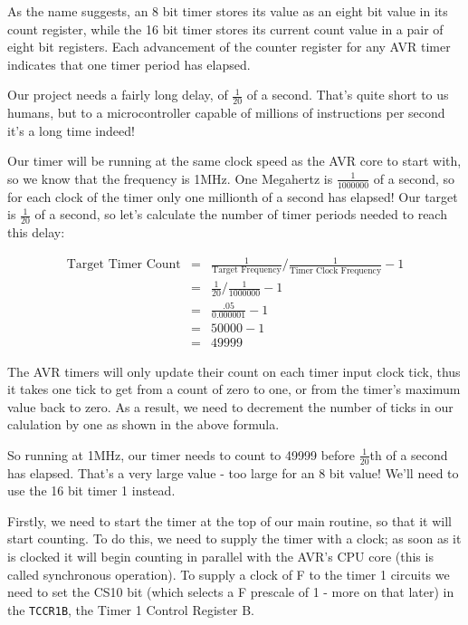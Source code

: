 \documentclass[a4paper,oneside,notitlepage]{book}
\begin{document}
As the name suggests, an 8 bit timer stores its value as an eight bit value in its count register, while the 16 bit timer stores its current count value in a pair of eight bit registers. Each advancement of the counter register for any AVR timer indicates that one timer period has elapsed.

Our project needs a fairly long delay, of \(\frac{1}{20}\) of a second. That's quite short to us humans, but to a microcontroller capable of millions of instructions per second it's a long time indeed!

Our timer will be running at the same clock speed as the AVR core to start with, so we know that the frequency is 1MHz. One Megahertz is \(\frac{1}{1000000}\) of a second, so for each clock of the timer only one millionth of a second has elapsed! Our target is \(\frac{1}{20}\) of a second, so let's calculate the number of timer periods needed to reach this delay:

\begin{displaymath}
\begin{array}{rcl}
\text{Target Timer Count} & = & \frac{1}{\text{Target Frequency}} / \frac{1}{\text{Timer Clock Frequency}} - 1 \\[6pt]
                          & = & \frac{1}{20} / \frac{1}{1000000} - 1 \\[6pt]
                          & = & \frac{.05}{0.000001} - 1 \\[6pt]
                          & = & 50000 - 1 \\[6pt]
                          & = & 49999
\end{array}
\end{displaymath}

The AVR timers will only update their count on each timer input clock tick, thus it takes one tick to get from a count of zero to one, or from the timer's maximum value back to zero. As a result, we need to decrement the number of ticks in our calulation by one as shown in the above formula.

So running at 1MHz, our timer needs to count to 49999 before \(\frac{1}{20}\)th of a second has elapsed. That's a very large value - too large for an 8 bit value! We'll need to use the 16 bit timer 1 instead.

Firstly, we need to start the timer at the top of our main routine, so that it will start counting. To do this, we need to supply the timer with a clock; as soon as it is clocked it will begin counting in parallel with the AVR's CPU core (this is called synchronous operation). To supply a clock of F to the timer 1 circuits we need to set the CS10 bit (which selects a F prescale of 1 - more on that later) in the \texttt{TCCR1B}, the Timer 1 Control Register B.
\end{document}
